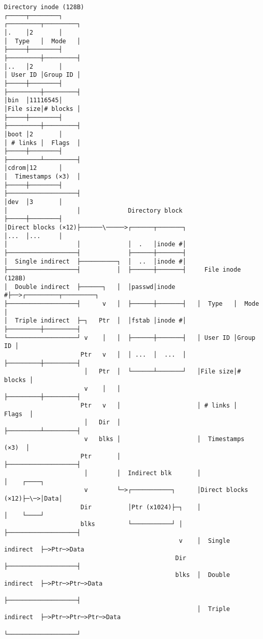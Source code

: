 \documentclass[varwidth=70em,crop]{standalone}
\begin{document}
\begin{verbatim}
Directory inode (128B)                                                      ┌─────┬────────┐
┌─────────┬─────────┐                                                       │.    │2       │
│  Type   │  Mode   │                                                       ├─────┼────────┤
├─────────┼─────────┤                                                       │..   │2       │
│ User ID │Group ID │                                                       ├─────┼────────┤
├─────────┼─────────┤                                                       │bin  │11116545│
│File size│# blocks │                                                       ├─────┼────────┤
├─────────┼─────────┤                                                       │boot │2       │
│ # links │  Flags  │                                                       ├─────┼────────┤
├─────────┴─────────┤                                                       │cdrom│12      │
│  Timestamps (×3)  │                                                       ├─────┼────────┤
├───────────────────┤                                                       │dev  │3       │
│                   │             Directory block                           ├─────┼────────┤
│Direct blocks (×12)├──────\─────>┌──────┬───────┐                          │...  │...     │
│                   │             │  .   │inode #│
├───────────────────┤             ├──────┼───────┤
│  Single indirect  ├──────────┐  │  ..  │inode #│
├───────────────────┤          │  ├──────┼───────┤     File inode (128B)
│  Double indirect  ├──────┐   │  │passwd│inode #├──>┌─────────┬─────────┐
├───────────────────┤      v   │  ├──────┼───────┤   │  Type   │  Mode   │
│  Triple indirect  ├─┐   Ptr  │  │fstab │inode #│   ├─────────┼─────────┤
└───────────────────┘ v    │   │  ├──────┼───────┤   │ User ID │Group ID │
                     Ptr   v   │  │ ...  │  ...  │   ├─────────┼─────────┤
                      │   Ptr  │  └──────┴───────┘   │File size│# blocks │
                      v    │   │                     ├─────────┼─────────┤
                     Ptr   v   │                     │ # links │  Flags  │
                      │   Dir  │                     ├─────────┴─────────┤
                      v   blks │                     │  Timestamps (×3)  │
                     Ptr       │                     ├───────────────────┤
                      │        │  Indirect blk       │                   │    ┌────┐
                      v        └─>┌───────────┐      │Direct blocks (×12)├─\─>│Data│
                     Dir          │Ptr (x1024)├─┐    │                   │    └────┘
                     blks         └───────────┘ │    ├───────────────────┤
                                                v    │  Single indirect  ├─>Ptr─>Data
                                               Dir   ├───────────────────┤
                                               blks  │  Double indirect  ├─>Ptr─>Ptr─>Data
                                                     ├───────────────────┤
                                                     │  Triple indirect  ├─>Ptr─>Ptr─>Ptr─>Data
                                                     └───────────────────┘
\end{verbatim}
\end{document}
